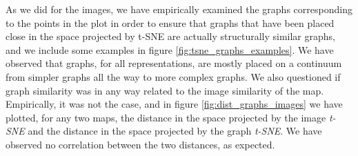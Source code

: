 As we did for the images, we have empirically examined the graphs corresponding to the points in the plot in order to ensure that graphs that have been placed close in the space projected by t-SNE are actually structurally similar graphs, and we include some examples in figure \cref{fig:tsne_graphs_examples}. We have observed that graphs, for all representations, are mostly placed on a continuum from simpler graphs all the way to more complex graphs. We also questioned if graph similarity was in any way related to the image similarity of the map. Empirically, it was not the case, and in figure \cref{fig:dist_graphs_images} we have plotted, for any two maps, the distance in the space projected by the image \textit{t-SNE} and the distance in the space projected by the graph \textit{t-SNE}. We have observed no correlation between the two distances, as expected.


